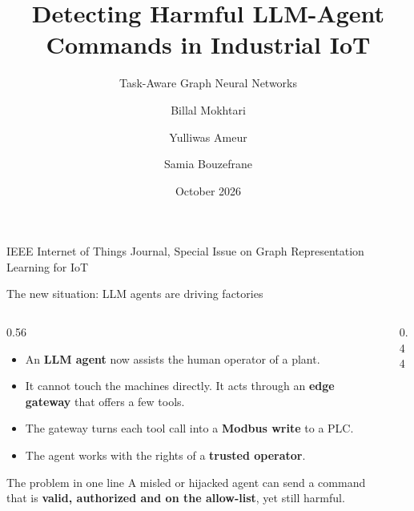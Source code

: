\documentclass[aspectratio=169]{beamer}
\title{\textbf{Detecting Harmful LLM-Agent Commands in Industrial IoT}}
\subtitle{Task-Aware Graph Neural Networks}
\author{Billal Mokhtari \and Yulliwas Ameur \and Samia Bouzefrane}
\institute{CEDRIC Laboratory, Cnam Paris \\ BATTwin project}
\date{October 2026}
\newcommand{\key}[1]{\textcolor{accent}{\textbf{#1}}}
\newcommand{\warn}[1]{\textcolor{accent2}{\textbf{#1}}}
\begin{document}
{
\begin{frame}
  \titlepage
  \begin{center}
  \footnotesize\textcolor{muted}{IEEE Internet of Things Journal, Special Issue on
  Graph Representation Learning for IoT}
  \end{center}
\end{frame}}

\begin{frame}{The new situation: LLM agents are driving factories}
\begin{columns}[T]
\begin{column}{0.56\textwidth}
\begin{itemize}
  \item An \key{LLM agent} now assists the human operator of a plant.
  \item It cannot touch the machines directly. It acts through an
        \key{edge gateway} that offers a few tools.
  \item The gateway turns each tool call into a \key{Modbus write} to a PLC.
  \item The agent works with the rights of a \key{trusted operator}.
\end{itemize}
\vspace{0.4em}
\begin{block}{The problem in one line}
A misled or hijacked agent can send a command that is \warn{valid,
authorized and on the allow-list}, yet still harmful.
\end{block}
\end{column}
\begin{column}{0.44\textwidth}
\centering
{}
\end{column}
\end{columns}
\end{frame}
\end{document}
